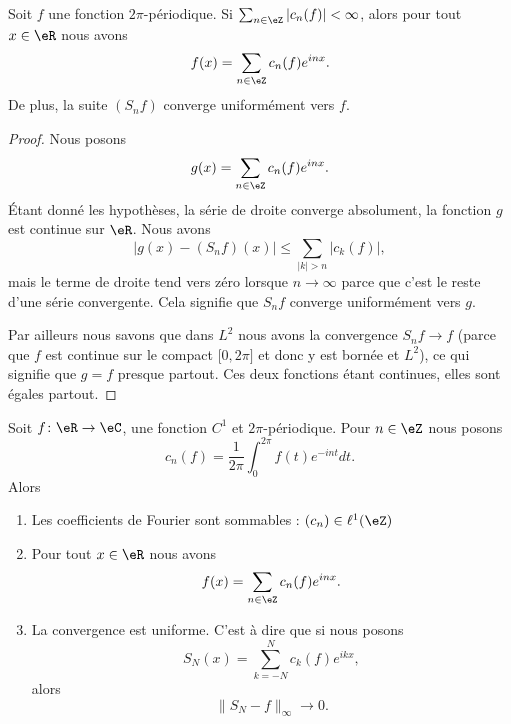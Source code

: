 \begin{proposition}     \label{PropSgvPab}
    Soit \( f\) une fonction \( 2\pi\)-périodique. Si \( \sum_{n\in \eZ}| c_n(f) |<\infty\), alors pour tout \( x\in \eR\) nous avons
    \begin{equation}
        f(x)=\sum_{n\in \eZ}c_n(f) e^{inx}.
    \end{equation}
    De plus, la suite \( (S_nf)\) converge uniformément vers \( f\).
\end{proposition}

\begin{proof}
    Nous posons
    \begin{equation}
        g(x)=\sum_{n\in \eZ}c_n(f) e^{inx}.
    \end{equation}
    Étant donné les hypothèses, la série de droite converge absolument, la fonction \( g\) est continue sur \( \eR\). Nous avons
    \begin{equation}
        \big| g(x)-(S_nf)(x) \big|\leq \sum_{| k |> n}| c_k(f) |,
    \end{equation}
    mais le terme de droite tend vers zéro lorsque \( n\to \infty\) parce que c'est le reste d'une série convergente. Cela signifie que \( S_nf\) converge uniformément vers \( g\).

    Par ailleurs nous savons que dans \( L^2\) nous avons la convergence \( S_nf\to f\) (parce que \( f\) est continue sur le compact \( \mathopen[ 0 , 2\pi \mathclose]\) et donc y est bornée et \( L^2\)), ce qui signifie que \( g=f\) presque partout. Ces deux fonctions étant continues, elles sont égales partout.
\end{proof}

\begin{theorem}     \label{ThozHXraQ}
    Soit \( f\colon \eR\to \eC\), une fonction \( C^1\) et \( 2\pi\)-périodique. Pour \( n\in \eZ\) nous posons
    \begin{equation}
        c_n(f)=\frac{1}{ 2\pi }\int_0^{2\pi}f(t) e^{-int}dt.
    \end{equation}
    Alors
    \begin{enumerate}
        \item
            Les coefficients de Fourier sont sommables : \( (c_n)\in \ell^1(\eZ)\) 
        \item
            Pour tout \( x\in \eR\) nous avons
            \begin{equation}
                f(x)=\sum_{n\in \eZ}c_n(f) e^{inx}.
            \end{equation}
        \item
            La convergence est uniforme. C'est à dire que si nous posons
            \begin{equation}
                S_N(x)=\sum_{k=-N}^Nc_k(f) e^{ikx},
            \end{equation}
            alors
            \begin{equation}
                \| S_N-f \|_{\infty}\to 0.
            \end{equation}
    \end{enumerate}
\end{theorem}

